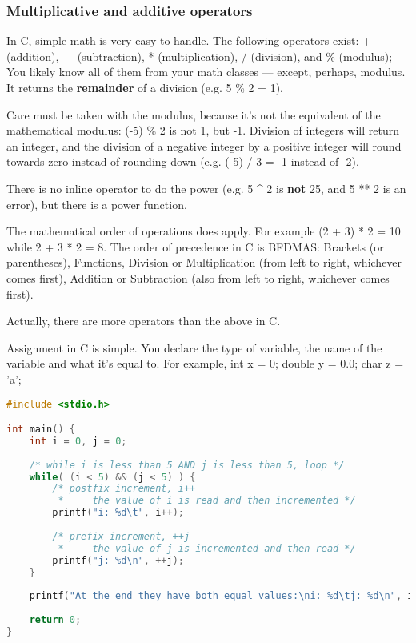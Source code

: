 \subsubsection{Multiplicative and additive operators}
In C, simple math is very easy to handle. The following operators exist: +
(addition), --- (subtraction), * (multiplication), / (division), and \%
(modulus); You likely know all of them from your math classes --- except,
perhaps, modulus. It returns the \textbf{remainder} of a division (e.g. 5 \% 2
= 1). 

Care must be taken with the modulus, because it's not the equivalent of the
mathematical modulus: (-5) \% 2 is not 1, but -1. Division of integers will
return an integer, and the division of a negative integer by a positive integer
will round towards zero instead of rounding down (e.g. (-5) / 3 = -1 instead of
-2).

There is no inline operator to do the power (e.g. 5 \^{} 2 is \textbf{not} 25,
and 5 ** 2 is an error), but there is a power function.

The mathematical order of operations does apply. For example (2 + 3) * 2 = 10
while 2 + 3 * 2 = 8. The order of precedence in C is BFDMAS: Brackets (or
parentheses), Functions, Division or Multiplication (from left to right,
whichever comes first), Addition or Subtraction (also from left to right,
whichever comes first).

Actually, there are more operators than the above in C.

Assignment in C is simple. You declare the type of variable, the name of the
variable and what it's equal to. For example, int x = 0; double y = 0.0; char z
= 'a';

\lstset{basicstyle=\scriptsize, numbers=left, captionpos=b, tabsize=4}
\begin{lstlisting}[caption=Section \thesection listing \arabic{mathcnt},language={C},
breaklines=true,xleftmargin=15pt,label=lst:section\thesection listing\arabic{mathcnt}]
#include <stdio.h>

int main() {
	int i = 0, j = 0;
	
	/* while i is less than 5 AND j is less than 5, loop */
	while( (i < 5) && (j < 5) ) {
		/* postfix increment, i++
		 *     the value of i is read and then incremented */
		printf("i: %d\t", i++);
		
		/* prefix increment, ++j 
		 *     the value of j is incremented and then read */
		printf("j: %d\n", ++j);
	}
	
	printf("At the end they have both equal values:\ni: %d\tj: %d\n", i, j);
	
	return 0;
}
\end{lstlisting}

